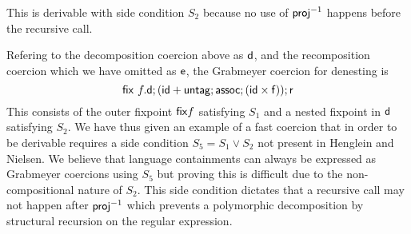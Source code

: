 \begin{example}[Fast but monomorphic]
This is derivable with side condition $S_2$ because no use of $\mathsf{proj}^{-1}$ happens before the recursive call.
\end{example}
\begin{remark}
Refering to the decomposition coercion above as $\mathsf{d}$, and the recomposition coercion which we have omitted as $\mathsf{e}$, the Grabmeyer coercion for denesting is
\[ \mathsf{fix}~f. \mathsf{d}; (\mathsf{id} + \mathsf{untag} ; \mathsf{assoc} ; (\mathsf{id} \times \mathsf{f})) ;\mathsf{r} \]
This consists of the outer fixpoint $\mathsf{fix} f$ satisfying $S_1$ and a nested fixpoint in $\mathsf{d}$ satisfying $S_2$. We have thus given an example of a fast coercion that in order to be derivable requires a side condition $S_5 = S_1 \lor S_2$ not present in Henglein and Nielsen.
We believe that language containments can always be expressed as Grabmeyer coercions using $S_5$ but proving this is difficult due to the non-compositional nature of $S_2$. This side condition dictates that a recursive call may not happen after $\mathsf{proj}^{-1}$ which prevents a polymorphic decomposition by structural recursion on the regular expression.
\end{remark}













